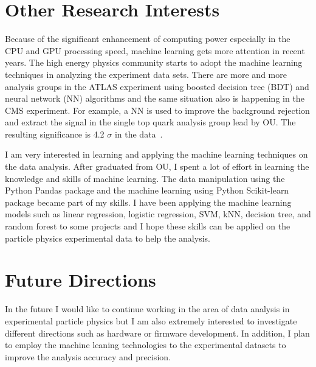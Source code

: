 \documentclass[12pt]{article}
\begin{document}
\section{Other Research Interests}
Because of the significant enhancement of computing power especially in the CPU and GPU processing speed, machine learning gets more attention in recent years. 
The high energy physics community starts to adopt the machine learning techniques in analyzing the experiment data sets.
There are more and more analysis groups in the ATLAS experiment using boosted decision tree (BDT) and neural network (NN) algorithms and the same situation also is happening in the CMS experiment.
For example, a NN is used to improve the background rejection and extract the signal in the single top quark analysis group lead by OU. The resulting significance is 4.2 $\sigma$ in the data~\cite{Aaboud:2017ylb}.

I am very interested in learning and applying the machine learning techniques on the  data analysis.
After graduated from OU, I spent a lot of effort in learning the knowledge and skills of  machine learning.
The data manipulation using the Python Pandas package and the machine learning using Python Scikit-learn package became part of my skills.
I have been applying the machine learning models such as linear regression, logistic regression, SVM, kNN, decision tree, and random forest to some projects and I hope these skills can be applied on the particle physics experimental data to help the analysis.


\section{Future Directions}
In the future I would like to continue working in the area of data analysis in experimental particle physics but I am also  extremely interested to investigate different directions such as hardware or firmware development.
In addition, I plan to employ the machine leaning technologies to the experimental datasets to improve the analysis accuracy and precision.

\end{document}

